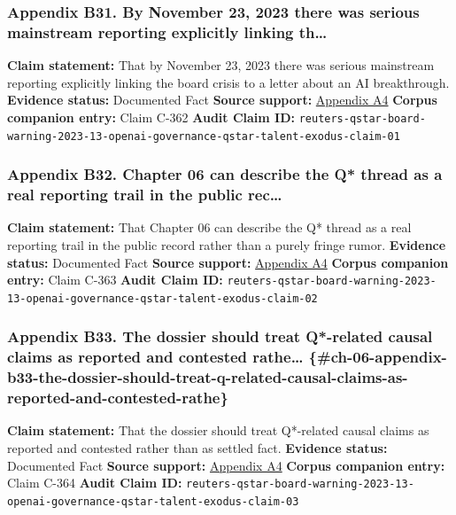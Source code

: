 \documentclass[
  american,
  11pt,
  letterpaper,
]{article}
\begin{document}
\subsubsection{Appendix B31. By November 23, 2023 there was serious
mainstream reporting explicitly linking
th\ldots{}}\label{ch-06-appendix-b31-by-november-23-2023-there-was-serious-mainstream-reporting-explicitly-linking-th}

\textbf{Claim statement:} That by November 23, 2023 there was serious
mainstream reporting explicitly linking the board crisis to a letter
about an AI breakthrough. \textbf{Evidence status:} Documented Fact
\textbf{Source support:}
\hyperref[ch-06-appendix-a4-openai-researchers-warned-board-of-ai-breakthrough-ahead-of-ceo-ouster-sources-say]{Appendix
A4} \textbf{Corpus companion entry:} Claim C-362 \textbf{Audit Claim
ID:}
\texttt{reuters-qstar-board-warning-2023-13-openai-governance-qstar-talent-exodus-claim-01}

\subsubsection{Appendix B32. Chapter 06 can describe the Q* thread as a
real reporting trail in the public
rec\ldots{}}\label{ch-06-appendix-b32-chapter-06-can-describe-the-q-thread-as-a-real-reporting-trail-in-the-public-rec}

\textbf{Claim statement:} That Chapter 06 can describe the Q* thread as
a real reporting trail in the public record rather than a purely fringe
rumor. \textbf{Evidence status:} Documented Fact \textbf{Source
support:}
\hyperref[ch-06-appendix-a4-openai-researchers-warned-board-of-ai-breakthrough-ahead-of-ceo-ouster-sources-say]{Appendix
A4} \textbf{Corpus companion entry:} Claim C-363 \textbf{Audit Claim
ID:}
\texttt{reuters-qstar-board-warning-2023-13-openai-governance-qstar-talent-exodus-claim-02}

\subsubsection{Appendix B33. The dossier should treat Q*-related causal
claims as reported and contested rathe\ldots{}
\{\#ch-06-appendix-b33-the-dossier-should-treat-q-related-causal-claims-as-reported-and-contested-rathe\}}\label{appendix-b33.-the-dossier-should-treat-q-related-causal-claims-as-reported-and-contested-rathe-ch-06-appendix-b33-the-dossier-should-treat-q-related-causal-claims-as-reported-and-contested-rathe}

\textbf{Claim statement:} That the dossier should treat Q*-related
causal claims as reported and contested rather than as settled fact.
\textbf{Evidence status:} Documented Fact \textbf{Source support:}
\hyperref[ch-06-appendix-a4-openai-researchers-warned-board-of-ai-breakthrough-ahead-of-ceo-ouster-sources-say]{Appendix
A4} \textbf{Corpus companion entry:} Claim C-364 \textbf{Audit Claim
ID:}
\texttt{reuters-qstar-board-warning-2023-13-openai-governance-qstar-talent-exodus-claim-03}
\end{document}
